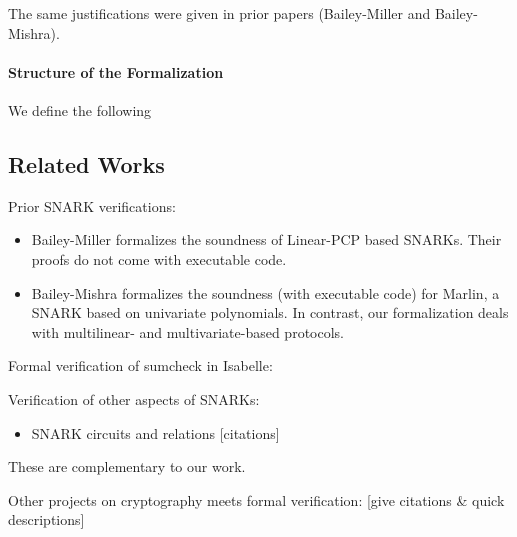The same justifications were given in prior papers (Bailey-Miller and Bailey-Mishra).

\paragraph{Structure of the Formalization}

We define the following 


\subsection{Related Works}\label{sec:related-works}

Prior SNARK verifications:
\begin{itemize}
    \item Bailey-Miller formalizes the soundness of Linear-PCP based SNARKs. Their proofs do not come with executable code.
    \item Bailey-Mishra formalizes the soundness (with executable code) for Marlin, a SNARK based on univariate polynomials. In contrast, our formalization deals with multilinear- and multivariate-based protocols.
\end{itemize}

Formal verification of sumcheck in Isabelle:

Verification of other aspects of SNARKs:
\begin{itemize}
    \item SNARK circuits and relations [citations] 
\end{itemize}
These are complementary to our work.

Other projects on cryptography meets formal verification: [give citations & quick descriptions]